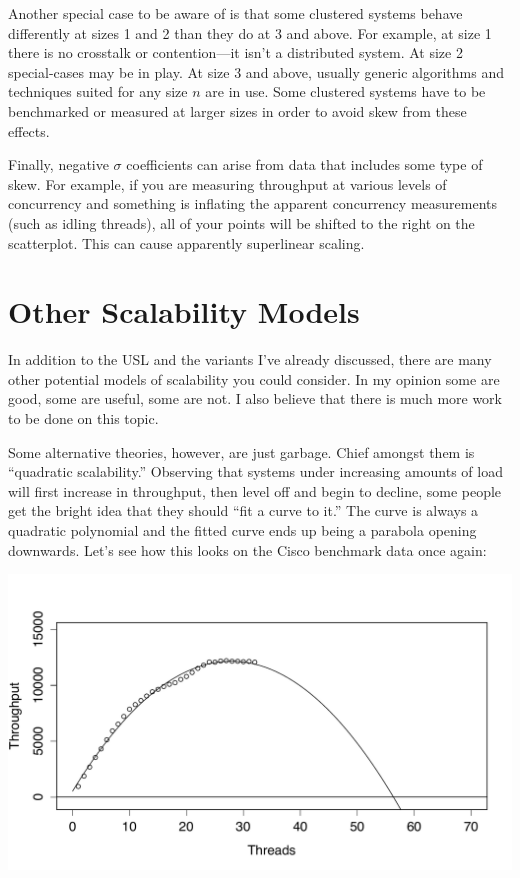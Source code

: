 \documentclass{vivid_layout}
\begin{document}
Another special case to be aware of is that some clustered systems behave
differently at sizes 1 and 2 than they do at 3 and above. For example, at size 1
there is no crosstalk or contention---it isn't a distributed system. At size 2
special-cases may be in play. At size 3 and above, usually generic algorithms
and techniques suited for any size $n$ are in use. Some clustered systems have
to be benchmarked or measured at larger sizes in order to avoid skew from these
effects.

Finally, negative $\sigma$ coefficients can arise from data that includes some
type of skew. For example, if you are measuring throughput at various levels of
concurrency and something is inflating the apparent concurrency measurements
(such as idling threads), all of your points will be shifted to the right on the
scatterplot. This can cause apparently superlinear scaling.

\newpage
\section{Other Scalability Models}

In addition to the USL and the variants I've already discussed, there are many
other potential models of scalability you could consider. In my opinion some are
good, some are useful, some are not. I also believe that there is much more work
to be done on this topic.

Some alternative theories, however, are just garbage. Chief amongst them is
``quadratic scalability.'' Observing that systems under increasing amounts of
load will first increase in throughput, then level off and begin to decline,
some people get the bright idea that they should ``fit a curve to it.'' The curve
is always a quadratic polynomial and the fitted curve ends up being a parabola
opening downwards. Let's see how this looks on the Cisco benchmark data 
once again:
\begin{center}
\includegraphics[width=.85\linewidth]{scalability/quadratic}
\end{center}
\end{document}
